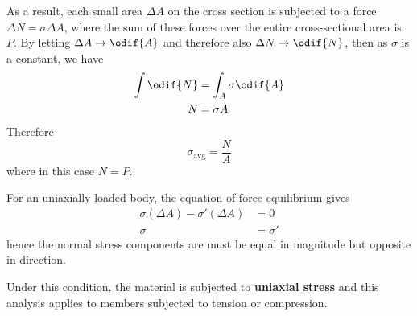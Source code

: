 \documentclass{article}
\begin{document}
As a result, each small area \(\Delta A\) on the cross section is subjected
to a force \(\Delta N = \sigma \Delta A\), where the sum of these forces over the entire cross-sectional area
is \(P\). By letting \(\Delta A \to \odif{A} \) and therefore also \( \Delta N \to \odif{N} \), then as \(\sigma\)
is a constant, we have
\begin{align*}
    \int \odif{N} & = \int_A \sigma \odif{A} \\
    N             & = \sigma A
\end{align*}
Therefore
\begin{equation*}
    \sigma_{\mathrm{avg}} = \frac{N}{A}
\end{equation*}
where in this case \(N = P\).
\begin{theorem}[Equilibrium]
    For an uniaxially loaded body, the equation of force equilibrium gives
    \begin{align*}
        \sigma \left( \Delta A \right) - \sigma' \left( \Delta A \right) & = 0       \\
        \sigma                                                           & = \sigma'
    \end{align*}
    hence the normal stress components are must be equal in magnitude but opposite in direction.

    Under this condition, the material is subjected to \textbf{uniaxial stress} and this analysis
    applies to members subjected to tension or compression.
\end{theorem}
\end{document}
